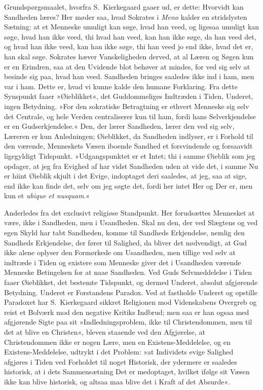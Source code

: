 \documentclass[12pt,a4paper]{article}
\begin{document}
Grundspørgsmaalet, hvorfra S.\ Kierkegaard gaaer ud, er dette:
Hvorvidt kan Sandheden læres? Her møder saa, hvad Sokrates i
\textit{Meno} kalder en stridslysten Sætning: at et Menneske
umuligt kan søge, hvad han veed, og ligesaa umuligt kan søge,
hvad han ikke veed, thi hvad han veed, kan han ikke søge, da
han veed det, og hvad han ikke veed, kan han ikke søge, thi han
veed jo end ikke, hvad det er, han skal søge. Sokrates hæver
Vanskeligheden derved, at al Læren og Søgen kun er en Erindren,
saa at den Uvidende blot behøver at mindes, for ved sig selv at
besinde sig paa, hvad han veed. Sandheden bringes saaledes ikke
ind i ham, men var i ham. Dette er, hvad vi kunne kalde den
humane Forklaring. Fra dette Synspunkt faaer »Øieblikket«, det
Guddommeliges Indtræden i Tiden, Underet, ingen Betydning. »For
den sokratiske Betragtning er ethvert Menneske sig selv det
Centrale, og hele Verden centraliserer kun til ham, fordi hans
Selverkjendelse er en Gudserkjendelse.« Den, der lærer
Sandheden, lærer den ved sig selv, Læreren er kun Anledningen;
Øieblikket, da Sandheden indlyser, er i Forhold til den
værende, Menneskets Væsen iboende Sandhed et forsvindende og
forsaavidt ligegyldigt Tidspunkt. »Udgangspunktet er et Intet;
thi i samme Øieblik som jeg opdager, at jeg fra Evighed af har
vidst Sandheden uden at vide det, i samme Nu er hiint Øieblik
skjult i det Evige, indoptaget deri saaledes, at jeg, saa at
sige, end ikke kan finde det, selv om jeg søgte det, fordi her
intet Her og Der er, men kun et \textit{ubique et nusquam}.«

Anderledes fra det exclusivt religiøse Standpunkt. Her
forudsættes Mennesket at være, ikke i Sandheden, men i
Usandheden. Skal nu den, der ved Slægtens og ved egen Skyld har
tabt Sandheden, komme til Sandheds Erkjendelse, nemlig den
Sandheds Erkjendelse, der fører til Salighed, da bliver det
nødvendigt, at Gud ikke alene oplyser den Formørkede om
Usandheden, men tillige ved selv at indtræde i Tiden og
existere som Menneske giver det i Usandheden værende Menneske
Betingelsen for at naae Sandheden. Ved Guds Selvmeddelelse i
Tiden faaer Øieblikket, det bestemte Tidspunkt, og dermed
Underet, absolut afgjørende Betydning. Underet er Forstandens
Paradox. Ved at fastholde Underet og opstille Paradoxet har
S.\ Kierkegaard sikkret Religionen mod Videnskabens Overgreb og
reist et Bolværk mod den negative Kritiks Indbrud; men saa er
han ogsaa med afgjørende Sigte paa sit »Indledningsproblem, ikke
til Christendommen, men til det at blive en Christen«, bleven
staaende ved den Afgjørelse, at Christendommen ikke er nogen
Lære, men en Existens-Meddelelse, og en Existens-Meddelelse,
udtrykt i det Problem: »at Individets evige Salighed afgjøres i
Tiden ved Forholdet til noget Historisk, der ydermere er
saaledes historisk, at i dets Sammensætning Det er medoptaget,
hvilket ifølge sit Væsen ikke kan blive historisk, og altsaa maa
blive det i Kraft af det Absurde«.
\end{document}
